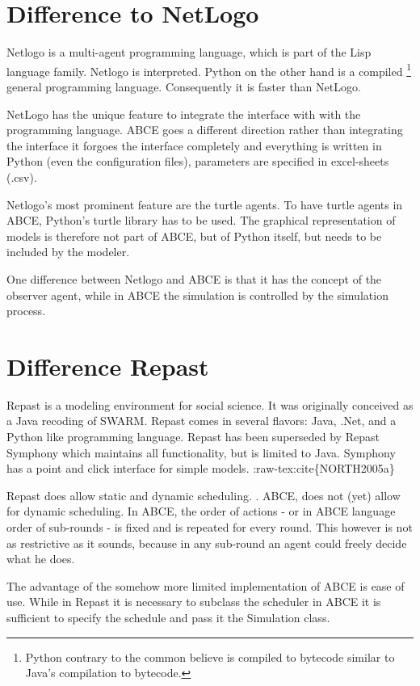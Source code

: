 \documentclass[letterpaper,10pt,english]{sphinxmanual}
\begin{document}
\section{Difference to NetLogo}
\label{introduction:difference-to-netlogo}
Netlogo is a multi-agent programming language, which is part of
the Lisp language family. Netlogo is interpreted.
\cite{Tisue2004} Python on the
other hand is a compiled \footnote{
Python contrary to the common believe is compiled to bytecode similar to Java's compilation to bytecode.
} general programming language.
Consequently it is faster than NetLogo.

NetLogo has the unique feature to integrate the interface with
with the programming language. ABCE goes a different direction
rather than integrating the interface it forgoes the interface
completely and everything is written in Python (even the
configuration files), parameters are specified in excel-sheets (.csv).

Netlogo's most prominent feature are the turtle agents. To
have turtle agents in ABCE, Python's turtle library has to be
used. The graphical representation of models is therefore not
part of ABCE, but of Python itself, but needs to be included by
the modeler.

One difference between Netlogo and ABCE is that it has the
concept of the observer agent, while in ABCE the simulation
is controlled by the simulation process.


\section{Difference Repast}
\label{introduction:difference-repast}
Repast is a modeling environment for social science. It was
originally conceived as a Java recoding of SWARM.
\cite{Collier} \cite{NORTH2005} Repast
comes in several flavors: Java, .Net, and a Python like
programming language. Repast has been superseded by
Repast Symphony which maintains all functionality, but
is limited to Java. Symphony has a point and click
interface for simple models. :raw-tex:cite\{NORTH2005a\}

Repast does allow static and dynamic scheduling.
\cite{Collier}. ABCE,
does not (yet) allow for dynamic scheduling. In ABCE, the
order of actions - or in ABCE language order of sub-rounds -
is fixed and is repeated for every round. This however is not
as restrictive as it sounds, because in any sub-round an
agent could freely decide what he does.

The advantage of the somehow more limited implementation of
ABCE is ease of use. While in Repast it is necessary to
subclass the scheduler in ABCE it is sufficient to specify
the schedule and pass it the Simulation class.
\end{document}

